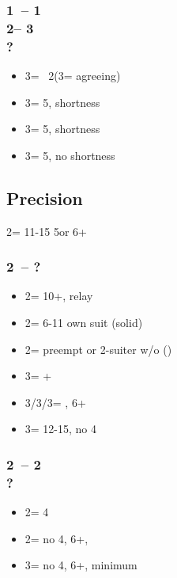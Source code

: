 \documentclass[12pt, a4paper]{report}
\begin{document}
\begin{bidpage}
\subsubsection*{1\clubs\ -- 1\hearts\\
                2\nt -- 3\clubs\\
                ?}
\begin{itemize}
    \item 3\diams = \bal\ 2\hearts (3\hearts = agreeing)
    \item 3\hearts = 5\diams, \hearts shortness
    \item 3\spades = 5\diams, \spades shortness
    \item 3\nt = 5\diams, no shortness
\end{itemize}
\end{bidpage}

\begin{bidpage}
\section{Precision}

2\clubs = 11-15 5\major or 6+\clubs

\subsubsection*{2\clubs\ -- ?}
\begin{itemize}
    \item 2\diams = 10+, relay
    \item 2\major = 6-11 own suit (solid)
    \item 2\nt = preempt \clubs or 2-suiter w/o \clubs (\clubs)
    \item 3\clubs = \inv + \clubs
    \item 3\diams/3\hearts/3\spades = \inv, 6+
    \item 3\nt = 12-15, no 4\major
\end{itemize}
\end{bidpage}

\begin{bidpage}
\subsubsection*{2\clubs\ -- 2\diams\\
                ?}
\begin{itemize}
    \item 2\major = 4\major
    \item 2\nt = no 4\major, 6+\clubs, \gf
    \item 3\clubs = no 4\major, 6+\clubs, minimum
\end{itemize}
\end{bidpage}
\end{document}
